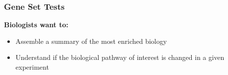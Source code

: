 \documentclass[9pt,t]{beamer}
\begin{document}
\begin{frame}
	\frametitle{Gene Set Tests}
	\vspace{2cm}
	{\color{oxygenpurple}\textbf{Biologists want to:}}\\
	\vspace{0.4cm}
\begin{itemize}
	\item Assemble a summary of the most enriched biology
	\item Understand if the biological pathway of interest is changed in a given experiment
\end{itemize}
\end{frame}
\end{document}
